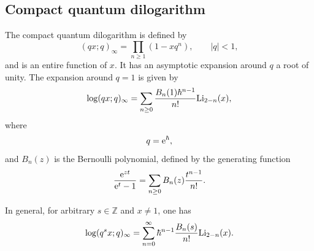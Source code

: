 \documentclass[a4paper,11pt]{article}
\theoremstyle{definition}
\def\IZ{{\mathbb Z}}
\newcommand{\re}{{\rm e}}
\newcommand{\ba}{\begin{aligned}}
\newcommand{\ea}{\end{aligned}}
\begin{document}
\subsection{Compact quantum dilogarithm}
\label{eq:com-qdilog}

The compact quantum dilogarithm is defined by \cite{fk}
%
\begin{equation}
(qx; q)_\infty = \prod_{n\ge 1} \left(1- x q^n \right), \qquad |q|<1,
\end{equation}
%
and is an entire function of $x$. It has an asymptotic expansion around $q$ a root of unity. The expansion around $q=1$
is given by 
\begin{equation}
  \log (qx; q)_\infty
  =\sum_{n \ge 0} { B_n(1) \hbar^{n-1} \over n!} {\rm Li}_{2-n} (x),
\end{equation}
%
where 
%
\begin{equation}
q= \re^{\hbar}, 
\end{equation}
%
and $B_n(z)$ is the Bernoulli polynomial, defined by the generating function 
%
\begin{equation}
{\re^{zt} \over \re^t-1 }=\sum_{n \ge 0} B_n(z) {t^{n-1} \over n!}. 
\end{equation}

%
%
%
%
%
%
In general, for arbitrary $s\in\IZ$ and $x\neq 1$, one has
\begin{equation}
  \log(q^s x;q)_\infty = \sum_{n=0}^\infty
  \hbar^{n-1}\frac{B_n(s)}{n!}{\rm Li}_{2-n}(x).
  \label{eq:cqlog-asymp}
\end{equation}
\end{document}

